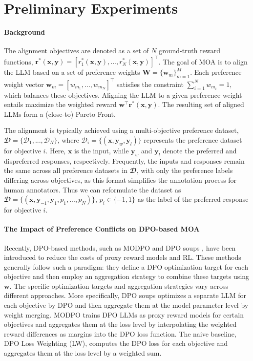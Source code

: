 \section{Preliminary Experiments} \label{sec:prelim_exp}

\paragraph{Background} 
The alignment objectives are denoted as a set of $N$ ground-truth reward functions, $\textbf{r}^*(\textbf{x}, \textbf{y}) = [r^*_1(\textbf{x}, \textbf{y}), ..., r^*_N(\textbf{x}, \textbf{y})]^{\intercal}$. 
The goal of MOA is to align the LLM based on a set of preference weights $\textbf{W} = \{\textbf{w}_m\}_{m=1}^M$. Each preference weight vector $\textbf{w}_m = [w_{m_1}, ..., w_{m_N}]^{\intercal}$ satisfies the constraint $\sum_{i=1}^N w_{m_i}=1$, which balances these objectives. 
Aligning the LLM to a given preference weight entails maximize the weighted reward $\textbf{w}^{\intercal}\textbf{r}^*(\textbf{x}, \textbf{y})$. The resulting set of aligned LLMs form a (close-to) Pareto Front. 

The alignment is typically achieved using a multi-objective preference dataset, $\mathbfcal{D} = \{\mathcal{D}_1, ..., \mathcal{D}_N\}$, where $\mathcal{D}_i = \{(\textbf{x}, \textbf{y}_w, \textbf{y}_l)\}$ represents the preference dataset for objective $i$. 
Here, $\textbf{x}$ is the input, while $\textbf{y}_w$ and $\textbf{y}_l$ denote the preferred and dispreferred responses, respectively. 
Frequently, the inputs and responses remain the same across all preference datasets in $\mathbfcal{D}$, with only the preference labels differing across objectives, as this format simplifies the annotation process for human annotators.
Thus we can reformulate the dataset as $\mathbfcal{D} = \{(\textbf{x}, \textbf{y}_{-   1}, \textbf{y}_1, p_1, ..., p_N)\}$, $p_i \in \{-1, 1\}$ as the label of the preferred response for objective $i$. 

\paragraph{The Impact of Preference Conflicts on DPO-based MOA}
Recently, DPO-based methods, such as MODPO \cite{DBLP:conf/acl/ZhouLS00O024} and DPO soups \cite{DBLP:conf/nips/RameCDGSSC23}, have been introduced to reduce the costs of proxy reward models and RL.
These methods generally follow such a paradigm: they define a DPO optimization target for each objective and then employ an aggregation strategy to combine these targets using $\textbf{w}$. 
The specific optimization targets and aggregation strategies vary across different approaches.
More specifically, DPO soups optimizes a separate LLM for each objective by DPO and then aggregate them at the model parameter level by weight merging. 
MODPO trains DPO LLMs as proxy reward models for certain objectives and aggregates them at the loss level by interpolating the weighted reward differences as margins into the DPO loss function.
The naive baseline, DPO Loss Weighting (LW), computes the DPO loss for each objective and aggregates them at the loss level by a weighted sum. 


